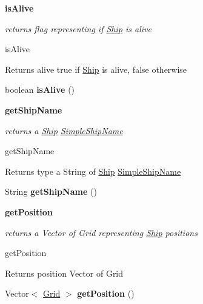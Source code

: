 \begin{Indent}{\bf is\+Alive}\par
{\em returns flag representing if \hyperlink{classbattleship_1_1ships_1_1Ship}{Ship} is alive

is\+Alive

\begin{DoxyReturn}{Returns}
alive true if \hyperlink{classbattleship_1_1ships_1_1Ship}{Ship} is alive, false otherwise 
\end{DoxyReturn}
}\begin{DoxyCompactItemize}
\item 
\hypertarget{classbattleship_1_1ships_1_1Ship_abcd70498d77a75bce05e4e6f1dd7d825}{}boolean {\bfseries is\+Alive} ()\label{classbattleship_1_1ships_1_1Ship_abcd70498d77a75bce05e4e6f1dd7d825}

\end{DoxyCompactItemize}
\end{Indent}
\begin{Indent}{\bf get\+Ship\+Name}\par
{\em returns a \hyperlink{classbattleship_1_1ships_1_1Ship}{Ship} \hyperlink{classbattleship_1_1ships_1_1SimpleShipName}{Simple\+Ship\+Name}

get\+Ship\+Name

\begin{DoxyReturn}{Returns}
type a String of \hyperlink{classbattleship_1_1ships_1_1Ship}{Ship} \hyperlink{classbattleship_1_1ships_1_1SimpleShipName}{Simple\+Ship\+Name} 
\end{DoxyReturn}
}\begin{DoxyCompactItemize}
\item 
\hypertarget{classbattleship_1_1ships_1_1Ship_a66bd111a55213872e68fc199fa133ed8}{}String {\bfseries get\+Ship\+Name} ()\label{classbattleship_1_1ships_1_1Ship_a66bd111a55213872e68fc199fa133ed8}

\end{DoxyCompactItemize}
\end{Indent}
\begin{Indent}{\bf get\+Position}\par
{\em returns a Vector of Grid representing \hyperlink{classbattleship_1_1ships_1_1Ship}{Ship} positions

get\+Position

\begin{DoxyReturn}{Returns}
position Vector of Grid 
\end{DoxyReturn}
}\begin{DoxyCompactItemize}
\item 
\hypertarget{classbattleship_1_1ships_1_1Ship_a9a37f64e4c29393faf6ad7231672a034}{}Vector$<$ \hyperlink{classbattleship_1_1gameboard_1_1Grid}{Grid} $>$ {\bfseries get\+Position} ()\label{classbattleship_1_1ships_1_1Ship_a9a37f64e4c29393faf6ad7231672a034}

\end{DoxyCompactItemize}
\end{Indent}
